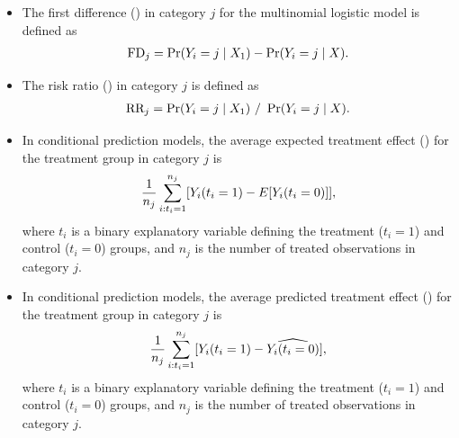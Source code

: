 \documentclass[letterpaper,10pt,english]{sphinxmanual}
\begin{document}
\begin{itemize}
\item {} 
The first difference () in category \(j\) for the
multinomial logistic model is defined as
\begin{gather}
\begin{split}\begin{aligned}
\text{FD}_j=\Pr(Y_i=j\mid X_{1})-\Pr(Y_i=j\mid X).\end{aligned}\end{split}\notag
\end{gather}
\item {} 
The risk ratio () in category \(j\) is defined as
\begin{gather}
\begin{split}\begin{aligned}
\text{RR}_j=\Pr(Y_i=j\mid X_{1})\ /\ \Pr(Y_i=j\mid X).\end{aligned}\end{split}\notag
\end{gather}
\item {} 
In conditional prediction models, the average expected treatment
effect () for the treatment group in category \(j\)
is
\begin{gather}
\begin{split}\begin{aligned}
\frac{1}{n_j}\sum_{i:t_{i}=1}^{n_j}[Y_{i}(t_{i}=1)-E[Y_{i}(t_{i}=0)]],\end{aligned}\end{split}\notag
\end{gather}
where \(t_{i}\) is a binary explanatory variable defining the
treatment (\(t_{i}=1\)) and control (\(t_{i}=0\)) groups, and
\(n_j\) is the number of treated observations in category
\(j\).

\item {} 
In conditional prediction models, the average predicted treatment
effect () for the treatment group in category \(j\)
is
\begin{gather}
\begin{split}\begin{aligned}
\frac{1}{n_j}\sum_{i:t_{i}=1}^{n_j}[Y_{i}(t_{i}=1)-\widehat{Y_{i}(t_{i}=0)}],\end{aligned}\end{split}\notag
\end{gather}
where \(t_{i}\) is a binary explanatory variable defining the
treatment (\(t_{i}=1\)) and control (\(t_{i}=0\)) groups, and
\(n_j\) is the number of treated observations in category
\(j\).

\end{itemize}
\end{document}
